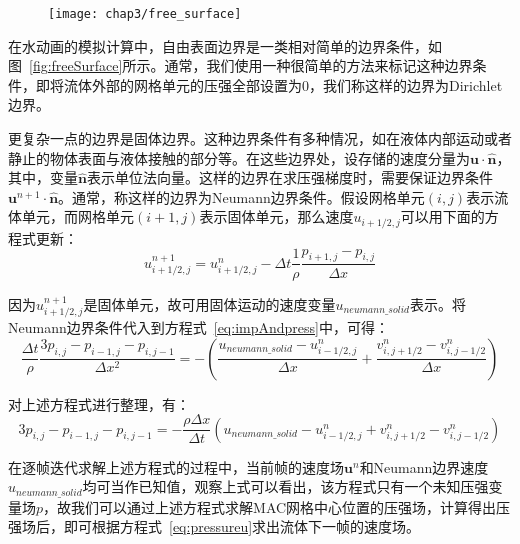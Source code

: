 \begin{figure}[ht]
  \centering
   \texttt{[image: chap3/free\_surface]}
\end{figure}

在水动画的模拟计算中，自由表面边界是一类相对简单的边界条件，如图~\ref{fig:freeSurface}所示。通常，我们使用一种很简单的方法来标记这种边界条件，即将流体外部的网格单元的压强全部设置为0，我们称这样的边界为Dirichlet边界。

更复杂一点的边界是固体边界。这种边界条件有多种情况，如在液体内部运动或者静止的物体表面与液体接触的部分等。在这些边界处，设存储的速度分量为$\boldsymbol u \cdot \hat {\boldsymbol n}$，其中，变量$\hat {\boldsymbol n}$表示单位法向量。这样的边界在求压强梯度时，需要保证边界条件$\boldsymbol u^{n + 1} \cdot \hat {\boldsymbol n}$。通常，称这样的边界为Neumann边界条件。假设网格单元$(i, j)$表示流体单元，而网格单元$(i + 1, j)$表示固体单元，那么速度$u_{i + 1 / 2, j}$可以用下面的方程式更新：
\begin{equation}
u_{i + 1 / 2, j} ^{n + 1} = u_{i + 1 / 2, j}^n - 
\Delta t \frac{1}{\rho} \frac{p_{i + 1, j} - p _{i, j}}{\Delta x}
\end{equation}

因为$u_{i + 1 / 2, j} ^{n + 1}$是固体单元，故可用固体运动的速度变量$u_{neumann\_solid}$表示。将Neumann边界条件代入到方程式~\ref{eq:impAndpress}中，可得：
\begin{equation}
\frac{\Delta t}{\rho}\frac{3p_{i, j} - p_{i - 1, j} - p_{i, j - 1}}{\Delta x^2} = -(\frac{u_{neumann\_solid} - u_{i - 1 / 2, j}^{n}}{\Delta x}  +
\frac{v_{i, j + 1 / 2}^n - v_{i, j - 1 / 2}^n}{\Delta x})
\end{equation}

对上述方程式进行整理，有：
\begin{equation}
\label{eq:proj}
{3p_{i, j} - p_{i - 1, j} - p_{i, j - 1}}= -\frac{\rho \Delta x}{\Delta t}({u_{neumann\_solid} - u_{i - 1 / 2, j}^{n}}  +
{v_{i, j + 1 / 2}^n - v_{i, j - 1 / 2}^n})
\end{equation}

在逐帧迭代求解上述方程式的过程中，当前帧的速度场$\boldsymbol u^n$和Neumann边界速度$u_{neumann\_solid}$均可当作已知值，观察上式可以看出，该方程式只有一个未知压强变量场$p$，故我们可以通过上述方程式求解MAC网格中心位置的压强场，计算得出压强场后，即可根据方程式~\ref{eq:pressureu}求出流体下一帧的速度场。

